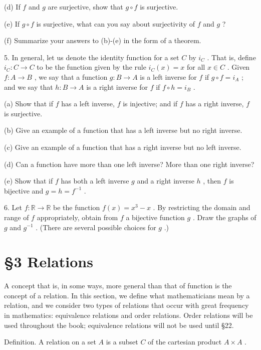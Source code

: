 \documentclass[10pt]{article}
\begin{document}
(d) If \(f\) and \(g\) are surjective, show that \(g \circ  f\) is surjective.

(e) If \(g \circ  f\) is surjective, what can you say about surjectivity of \(f\) and \(g\) ?

(f) Summarize your answers to (b)-(e) in the form of a theorem.

5. In general, let us denote the identity function for a set \(C\) by \({i}_{C}\) . That is, define \({i}_{C} : C \rightarrow  C\) to be the function given by the rule \({i}_{C}\left( x\right)  = x\) for all \(x \in  C\) . Given \(f : A \rightarrow  B\) , we say that a function \(g : B \rightarrow  A\) is a left inverse for \(f\) if \(g \circ  f = {i}_{A}\) ; and we say that \(h : B \rightarrow  A\) is a right inverse for \(f\) if \(f \circ  h = {i}_{B}\) .

(a) Show that if \(f\) has a left inverse, \(f\) is injective; and if \(f\) has a right inverse, \(f\) is surjective.

(b) Give an example of a function that has a left inverse but no right inverse.

(c) Give an example of a function that has a right inverse but no left inverse.

(d) Can a function have more than one left inverse? More than one right inverse?

(e) Show that if \(f\) has both a left inverse \(g\) and a right inverse \(h\) , then \(f\) is bijective and \(g = h = {f}^{-1}\) .

6. Let \(f : \mathbb{R} \rightarrow  \mathbb{R}\) be the function \(f\left( x\right)  = {x}^{3} - x\) . By restricting the domain and range of \(f\) appropriately, obtain from \(f\) a bijective function \(g\) . Draw the graphs of \(g\) and \({g}^{-1}\) . (There are several possible choices for \(g\) .)

\section*{§3 Relations}

A concept that is, in some ways, more general than that of function is the concept of a relation. In this section, we define what mathematicians mean by a relation, and we consider two types of relations that occur with great frequency in mathematics: equivalence relations and order relations. Order relations will be used throughout the book; equivalence relations will not be used until §22.

Definition. A relation on a set \(A\) is a subset \(C\) of the cartesian product \(A \times  A\) .
\end{document}
